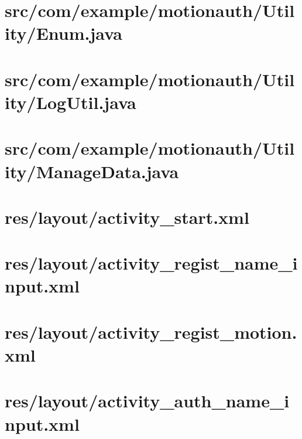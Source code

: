 \documentclass[12pt]{jreport}
\renewcommand{\slash}{/}
\begin{document}
    \section{src\slash com\slash example\slash motionauth\slash Utility\slash Enum.java}
    

    \section{src\slash com\slash example\slash motionauth\slash Utility\slash LogUtil.java}
    

    \section{src\slash com\slash example\slash motionauth\slash Utility\slash ManageData.java}
    

    \section{res\slash layout\slash activity\_start.xml}
    

    \section{res\slash layout\slash activity\_regist\_name\_input.xml}
    

    \section{res\slash layout\slash activity\_regist\_motion.xml}
    

    \section{res\slash layout\slash activity\_auth\_name\_input.xml}
    
\end{document}
